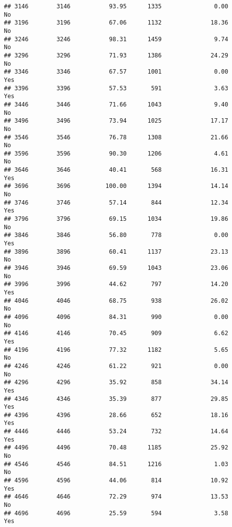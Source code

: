\documentclass[
]{article}
\begin{document}
\begin{verbatim}
## 3146        3146           93.95      1335               0.00                No
## 3196        3196           67.06      1132              18.36                No
## 3246        3246           98.31      1459               9.74                No
## 3296        3296           71.93      1386              24.29                No
## 3346        3346           67.57      1001               0.00               Yes
## 3396        3396           57.53       591               3.63               Yes
## 3446        3446           71.66      1043               9.40                No
## 3496        3496           73.94      1025              17.17                No
## 3546        3546           76.78      1308              21.66                No
## 3596        3596           90.30      1206               4.61                No
## 3646        3646           40.41       568              16.31               Yes
## 3696        3696          100.00      1394              14.14                No
## 3746        3746           57.14       844              12.34               Yes
## 3796        3796           69.15      1034              19.86                No
## 3846        3846           56.80       778               0.00               Yes
## 3896        3896           60.41      1137              23.13                No
## 3946        3946           69.59      1043              23.06                No
## 3996        3996           44.62       797              14.20               Yes
## 4046        4046           68.75       938              26.02                No
## 4096        4096           84.31       990               0.00                No
## 4146        4146           70.45       909               6.62               Yes
## 4196        4196           77.32      1182               5.65                No
## 4246        4246           61.22       921               0.00                No
## 4296        4296           35.92       858              34.14               Yes
## 4346        4346           35.39       877              29.85               Yes
## 4396        4396           28.66       652              18.16               Yes
## 4446        4446           53.24       732              14.64               Yes
## 4496        4496           70.48      1185              25.92                No
## 4546        4546           84.51      1216               1.03                No
## 4596        4596           44.06       814              10.92               Yes
## 4646        4646           72.29       974              13.53                No
## 4696        4696           25.59       594               3.58               Yes

\end{verbatim}
\end{document}
